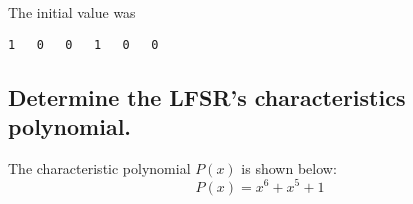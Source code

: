 \documentclass{article}
\begin{document}
The initial value was 
\begin{verbatim}
1	0	0	1	0	0
\end{verbatim}

\subsection*{Determine the LFSR's characteristics polynomial.}
The characteristic polynomial $P(x)$ is shown below:
\begin{equation}
P(x) = x^6 + x^5 + 1
\end{equation}
\end{document}
